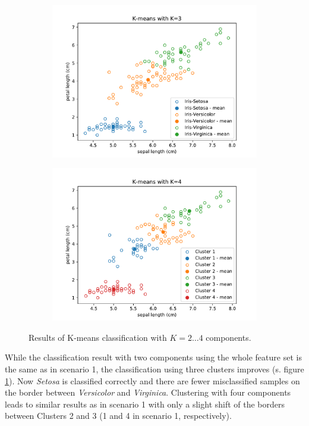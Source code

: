 \documentclass{article}
\begin{document}
\begin{figure}[!ht]
{\begin{subfigure}{0.6\textwidth}
	\includegraphics[width=\textwidth]{./Figures/2_2_Kmeans_scatter_K3}
	\end{subfigure}
	\begin{subfigure}{0.6\textwidth}
	\includegraphics[width=\textwidth]{./Figures/2_2_Kmeans_scatter_K4}
	\end{subfigure}
	}	
	\caption{Results of K-means classification with $K=2\dots4$ components.}
	\label{2_2_Kmeans_scatter}
\end{figure}

While the classification result with two components using the whole feature set is the same as in scenario 1, the classification using three clusters improves (s. figure \ref{2_2_Kmeans_scatter}). Now \textit{Setosa} is classified correctly and there are fewer misclassified samples on the border between \textit{Versicolor} and \textit{Virginica}. Clustering with four components leads to similar results as in scenario 1 with only a slight shift of the borders between Clusters 2 and 3 (1 and 4 in scenario 1, respectively).
\end{document}
